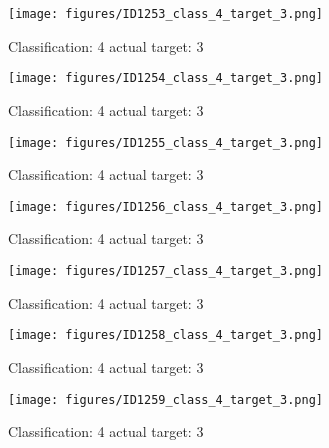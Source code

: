 \begin{figure}[h!]
\begin{center}
\texttt{[image: figures/ID1253\_class\_4\_target\_3.png]}
\end{center}
\caption{ Classification: 4 actual target: 3}
\label{fig:ID1253_class_4_target_3}
\end{figure}
\begin{figure}[h!]
\begin{center}
\texttt{[image: figures/ID1254\_class\_4\_target\_3.png]}
\end{center}
\caption{ Classification: 4 actual target: 3}
\label{fig:ID1254_class_4_target_3}
\end{figure}
\begin{figure}[h!]
\begin{center}
\texttt{[image: figures/ID1255\_class\_4\_target\_3.png]}
\end{center}
\caption{ Classification: 4 actual target: 3}
\label{fig:ID1255_class_4_target_3}
\end{figure}
\begin{figure}[h!]
\begin{center}
\texttt{[image: figures/ID1256\_class\_4\_target\_3.png]}
\end{center}
\caption{ Classification: 4 actual target: 3}
\label{fig:ID1256_class_4_target_3}
\end{figure}
\begin{figure}[h!]
\begin{center}
\texttt{[image: figures/ID1257\_class\_4\_target\_3.png]}
\end{center}
\caption{ Classification: 4 actual target: 3}
\label{fig:ID1257_class_4_target_3}
\end{figure}
\begin{figure}[h!]
\begin{center}
\texttt{[image: figures/ID1258\_class\_4\_target\_3.png]}
\end{center}
\caption{ Classification: 4 actual target: 3}
\label{fig:ID1258_class_4_target_3}
\end{figure}
\begin{figure}[h!]
\begin{center}
\texttt{[image: figures/ID1259\_class\_4\_target\_3.png]}
\end{center}
\caption{ Classification: 4 actual target: 3}
\label{fig:ID1259_class_4_target_3}
\end{figure}
